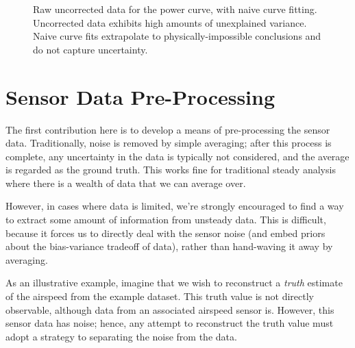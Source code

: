 \documentclass[conf]{new-aiaa}
\begin{document}
    \begin{figure}[H]
        \centering
        \caption{Raw uncorrected data for the power curve, with naive curve fitting. Uncorrected data exhibits high amounts of unexplained variance. Naive curve fits extrapolate to physically-impossible conclusions and do not capture uncertainty.}
        \label{fig:power_curve_naive}
    \end{figure}


    \section{Sensor Data Pre-Processing}

    The first contribution here is to develop a means of pre-processing the sensor data. Traditionally, noise is removed by simple averaging; after this process is complete, any uncertainty in the data is typically not considered, and the average is regarded as the ground truth. This works fine for traditional steady analysis where there is a wealth of data that we can average over.

    However, in cases where data is limited, we're strongly encouraged to find a way to extract some amount of information from unsteady data. This is difficult, because it forces us to directly deal with the sensor noise (and embed priors about the bias-variance tradeoff of data), rather than hand-waving it away by averaging.

    As an illustrative example, imagine that we wish to reconstruct a \emph{truth} estimate of the airspeed from the example dataset. This truth value is not directly observable, although data from an associated airspeed sensor is. However, this sensor data has noise; hence, any attempt to reconstruct the truth value must adopt a strategy to separating the noise from the data.
\end{document}

